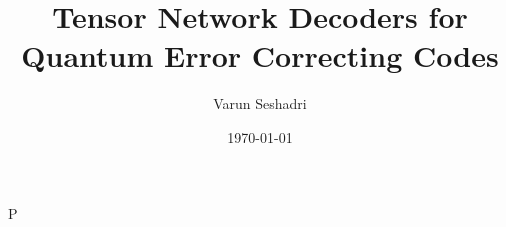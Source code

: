 \documentclass[11pt, twoside]{report}
\theoremstyle{definition}
\begin{document}
\begin{titlepage}
    \title{Tensor Network Decoders for Quantum Error Correcting Codes}
    \author{Varun Seshadri}
    \date{\today}
\end{titlepage}
\maketitle
% 

\newpage
\tableofcontents
\listoftodos{}



% 

P

\newpage
\nocite{*}
\printbibliography[title=\refname]

\restoregeometry
\newpage


\end{document}
